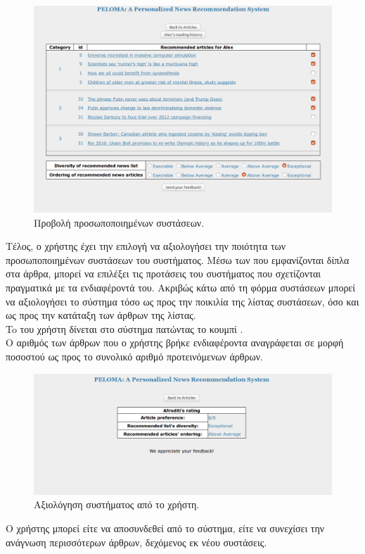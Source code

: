 \begin{figure}[!ht] \centering
\centerline{
    \includegraphics[scale=0.55]{static/figures/peloma/recommend.png}}
    \caption{Προβολή προσωποποιημένων συστάσεων.}
    \label{}
\end{figure} 

\newpage
Τέλος, ο χρήστης έχει την επιλογή να αξιολογήσει την ποιότητα των προσωποποιημένων συστάσεων του συστήματος. 
Μέσω των {} που εμφανίζονται δίπλα στα άρθρα, 
μπορεί να επιλέξει τις προτάσεις του συστήματος που σχετίζονται πραγματικά με τα ενδιαφέροντά του. 
Ακριβώς κάτω από τη φόρμα συστάσεων μπορεί να αξιολογήσει το σύστημα 
τόσο ως προς την ποικιλία της λίστας συστάσεων, όσο και ως προς την κατάταξη των άρθρων της λίστας.\\

To {} του χρήστη δίνεται στο σύστημα πατώντας το κουμπί {}. \\

Ο αριθμός των άρθρων που ο χρήστης βρήκε ενδιαφέροντα αναγράφεται σε μορφή ποσοστού 
ως προς το συνολικό αριθμό προτεινόμενων άρθρων. \\

\begin{figure}[!ht] \centering
\centerline{
    \includegraphics[scale=0.43]{static/figures/peloma/feedback2.png}}
    \caption{Αξιολόγηση συστήματος από το χρήστη.}
    \label{}
\end{figure} 

Ο χρήστης μπορεί είτε να αποσυνδεθεί από το σύστημα, είτε να συνεχίσει την ανάγνωση περισσότερων άρθρων, 
δεχόμενος εκ νέου συστάσεις. 